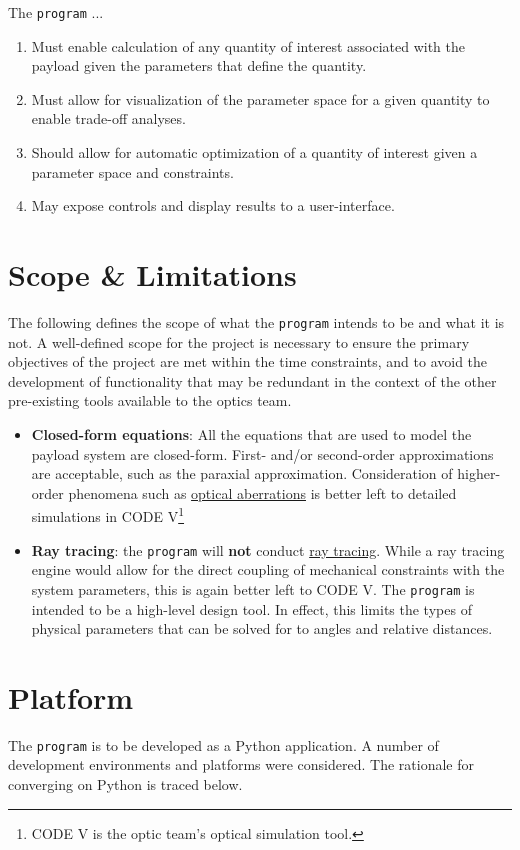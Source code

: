 \documentclass{article}
\begin{document}
The \texttt{program} ...
\begin{enumerate}
    \item Must enable calculation of any quantity of interest associated with the payload given the parameters that define the quantity.
    \item Must allow for visualization of the parameter space for a given quantity to enable trade-off analyses.
    \item Should allow for automatic optimization of a quantity of interest given a parameter space and constraints.
    \item May expose controls and display results to a user-interface.
\end{enumerate}


\section{Scope \& Limitations} \label{sec:scope}
The following defines the scope of what the \texttt{program} intends to be and what it is not. A well-defined scope for the project is necessary to ensure the primary objectives of the project are met within the time constraints, and to avoid the development of functionality that may be redundant in the context of the other pre-existing tools available to the optics team.

\begin{itemize}
    \item \textbf{Closed-form equations}: All the equations that are used to model the payload system are closed-form. First- and/or second-order approximations are acceptable, such as the paraxial approximation. Consideration of higher-order phenomena such as \href{https://en.wikipedia.org/wiki/Optical_aberration}{optical aberrations} is better left to detailed simulations in CODE V\footnote{CODE V is the optic team's optical simulation tool.}
    \item \textbf{Ray tracing}: the \texttt{program} will \textbf{not} conduct \href{https://www.synopsys.com/glossary/what-is-ray-tracing.html}{ray tracing}. While a ray tracing engine would allow for the direct coupling of mechanical constraints with the system parameters, this is again better left to CODE V. The \texttt{program} is intended to be a high-level design tool. In effect, this limits the types of physical parameters that can be solved for to angles and relative distances.
\end{itemize}

\section{Platform}
The \texttt{program} is to be developed as a Python application. A number of development environments and platforms were considered. The rationale for converging on Python is traced below.
\end{document}
